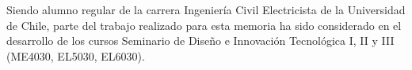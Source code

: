 \documentclass[11pt,letterpaper]{article}
\begin{document}
Siendo alumno regular de la carrera Ingeniería Civil Electricista de la Universidad de Chile, parte del trabajo realizado para esta memoria ha sido considerado en el desarrollo de los cursos Seminario de Diseño e Innovación Tecnológica I, II y III (ME4030, EL5030, EL6030).


% 	
\end{document}
